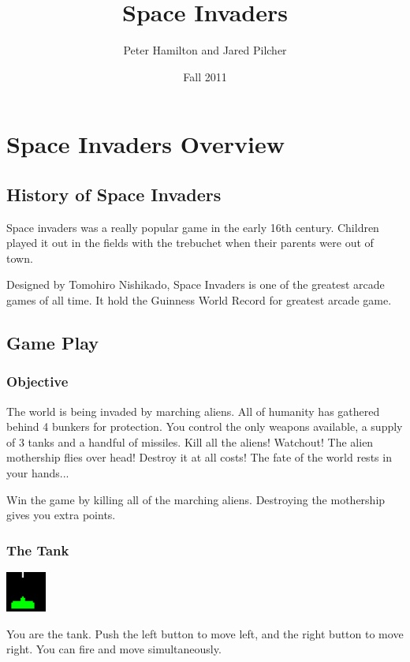 \documentclass[11pt,letter,oneside]{report}
\begin{document}
\title{Space Invaders}
\author{Peter Hamilton and Jared Pilcher}
\date{Fall 2011}
\maketitle

\tableofcontents

\chapter{Space Invaders Overview}
\section{History of Space Invaders}

Space invaders was a really popular game in the early 16th century.  Children played it out in the fields with the trebuchet when their parents were out of town.

Designed by Tomohiro Nishikado, Space Invaders is one of the greatest arcade games of all time.  It hold the Guinness World Record for greatest arcade game.
 

\section{Game Play}

\subsection{Objective}

The world is being invaded by marching aliens.  All of humanity has gathered behind 4 bunkers for protection.  You control the only weapons available, a supply of 3 tanks and a handful of missiles. Kill all the aliens! Watchout! The alien mothership flies over head! Destroy it at all costs!  The fate of the world rests in your hands...

Win the game by killing all of the marching aliens. Destroying the mothership gives you extra points.

\subsection{The Tank}
\includegraphics[]{tank.jpg}

You are the tank. Push the left button to move left, and the right button to move right. You can fire and move simultaneously.
\end{document}
